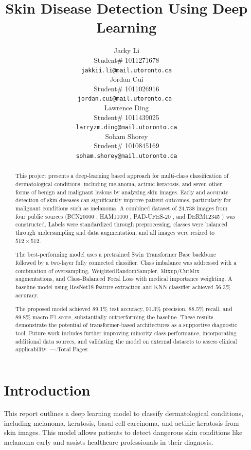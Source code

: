 \documentclass{article} %
\title{Skin Disease Detection Using Deep Learning}
\author{Jacky Li  \\
Student\# 1011271678\\
\texttt{jakkii.li@mail.utoronto.ca} \\
\And
Jordan Cui  \\
Student\# 1011026916 \\
\texttt{jordan.cui@mail.utoronto.ca \phantom{    }} \\
\AND
Lawrence Ding  \\
Student\# 1011439025 \\
\texttt{larryzm.ding@mail.utoronto.ca} \\
\And
Soham Shorey \\
Student\# 1010845169 \\
\texttt{soham.shorey@mail.utoronto.ca} \\
\AND
}
\begin{document}
\maketitle

\vspace{-1cm}

\begin{abstract}
This project presents a deep-learning based approach for multi-class classification of dermatological conditions, including melanoma, actinic keratosis, and seven other forms of benign and malignant lesions by analyzing skin images. Early and accurate detection of skin diseases can significantly improve patient outcomes, particularly for malignant conditions such as melanoma. A combined dataset of 24,738 images from four public sources (BCN20000 \citep{isic_bcn20000}, HAM10000 \citep{ham10000_dataset}, PAD-UFES-20 \citep{pad_ufes_dataset}, and DERM12345 \citep{yilmaz2024derm12345}) was constructed. Labels were standardized through preprocessing, classes were balanced through undersampling and data augmentation, and all images were resized to $512 \times 512$.

The best-performing model uses a pretrained Swin Transformer Base backbone followed by a two-layer fully connected classifier. Class imbalance was addressed with a combination of oversampling, WeightedRandomSampler, Mixup/CutMix augmentations, and Class-Balanced Focal Loss with medical importance weighting. A baseline model using ResNet18 feature extraction and KNN classifier achieved 56.3\% accuracy.

The proposed model achieved 89.1\% test accuracy, 91.3\% precision, 88.5\% recall, and 89.8\% macro F1-score, substantially outperforming the baseline. These results demonstrate the potential of transformer-based architectures as a supportive diagnostic tool. Future work includes further improving minority class performance, incorporating additional data sources, and validating the model on external datasets to assess clinical applicability.
----Total Pages: \pageref{last_page}
\end{abstract}

\section{Introduction}

This report outlines a deep learning model to classify dermatological conditions, including melanoma, keratosis, basal cell carcinoma, and actinic keratosis from skin images. This model allows patients to detect dangerous skin conditions like melanoma early and assists healthcare professionals in their diagnosis.
\end{document}
